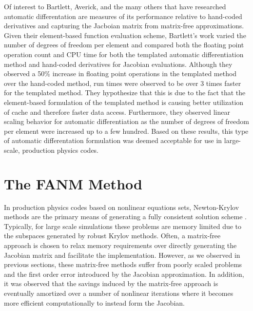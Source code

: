 Of interest to Bartlett, Averick, and the many others that have
researched automatic differentation are measures of its performance
relative to hand-coded derivatives and capturing the Jacboian matrix
from matrix-free approximations. Given their element-based function
evaluation scheme, Bartlett's work varied the number of degrees of
freedom per element and compared both the floating point operation
count and CPU time for both the templated automatic differentiation
method and hand-coded derivatives for Jacobian evaluations. Although
they observed a 50\% increase in floating point operations in the
templated method over the hand-coded method, run times were observed
to be over 3 times faster for the templated method. They hypothesize
that this is due to the fact that the element-based formulation of the
templated method is causing better utilization of cache and therefore
faster data access. Furthermore, they observed linear scaling behavior
for automatic differentiation as the number of degrees of freedom per
element were increased up to a few hundred. Based on these results,
this type of automatic differentation formulation was deemed
acceptable for use in large-scale, production physics codes.

\section{The FANM Method}
\label{sec:fanm}
In production physics codes based on nonlinear equations sets,
Newton-Krylov methods are the primary means of generating a fully
consistent solution scheme
\citep{evans_development_2006,evans_enhanced_2007,gaston_parallel_2009,godoy_parallel_2012}. Typically,
for large scale simulations these problems are memory limited due to
the subspaces generated by robust Krylov methods. Often, a matrix-free
approach is chosen to relax memory requirements over directly
generating the Jacobian matrix and facilitate the
implementation. However, as we observed in previous sections, these
matrix-free methods suffer from poorly scaled problems and the first
order error introduced by the Jacobian approximation. In addition, it
was observed that the savings induced by the matrix-free approach is
eventually amortized over a number of nonlinear iterations where it
becomes more efficient computationally to instead form the Jacobian.

